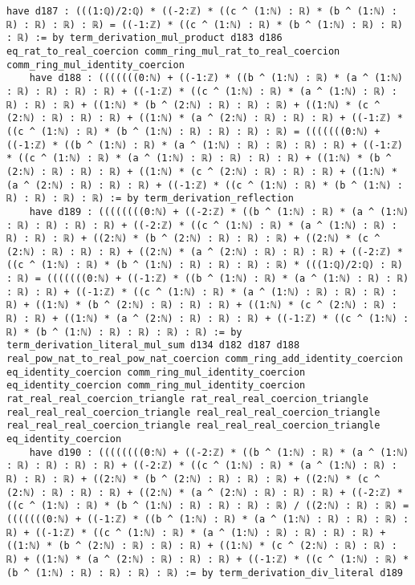 \documentclass{article}
\begin{document}
\begin{tcolorbox}[colback=white!10, width=\linewidth]
\begin{lstlisting}[language=Lean4]
    have d187 : (((1:ℚ)/2:ℚ) * ((-2:ℤ) * ((c ^ (1:ℕ) : ℝ) * (b ^ (1:ℕ) : ℝ) : ℝ) : ℝ) : ℝ) = ((-1:ℤ) * ((c ^ (1:ℕ) : ℝ) * (b ^ (1:ℕ) : ℝ) : ℝ) : ℝ) := by term_derivation_mul_product d183 d186 eq_rat_to_real_coercion comm_ring_mul_rat_to_real_coercion comm_ring_mul_identity_coercion
    have d188 : (((((((0:ℕ) + ((-1:ℤ) * ((b ^ (1:ℕ) : ℝ) * (a ^ (1:ℕ) : ℝ) : ℝ) : ℝ) : ℝ) + ((-1:ℤ) * ((c ^ (1:ℕ) : ℝ) * (a ^ (1:ℕ) : ℝ) : ℝ) : ℝ) : ℝ) + ((1:ℕ) * (b ^ (2:ℕ) : ℝ) : ℝ) : ℝ) + ((1:ℕ) * (c ^ (2:ℕ) : ℝ) : ℝ) : ℝ) + ((1:ℕ) * (a ^ (2:ℕ) : ℝ) : ℝ) : ℝ) + ((-1:ℤ) * ((c ^ (1:ℕ) : ℝ) * (b ^ (1:ℕ) : ℝ) : ℝ) : ℝ) : ℝ) = (((((((0:ℕ) + ((-1:ℤ) * ((b ^ (1:ℕ) : ℝ) * (a ^ (1:ℕ) : ℝ) : ℝ) : ℝ) : ℝ) + ((-1:ℤ) * ((c ^ (1:ℕ) : ℝ) * (a ^ (1:ℕ) : ℝ) : ℝ) : ℝ) : ℝ) + ((1:ℕ) * (b ^ (2:ℕ) : ℝ) : ℝ) : ℝ) + ((1:ℕ) * (c ^ (2:ℕ) : ℝ) : ℝ) : ℝ) + ((1:ℕ) * (a ^ (2:ℕ) : ℝ) : ℝ) : ℝ) + ((-1:ℤ) * ((c ^ (1:ℕ) : ℝ) * (b ^ (1:ℕ) : ℝ) : ℝ) : ℝ) : ℝ) := by term_derivation_reflection
    have d189 : ((((((((0:ℕ) + ((-2:ℤ) * ((b ^ (1:ℕ) : ℝ) * (a ^ (1:ℕ) : ℝ) : ℝ) : ℝ) : ℝ) + ((-2:ℤ) * ((c ^ (1:ℕ) : ℝ) * (a ^ (1:ℕ) : ℝ) : ℝ) : ℝ) : ℝ) + ((2:ℕ) * (b ^ (2:ℕ) : ℝ) : ℝ) : ℝ) + ((2:ℕ) * (c ^ (2:ℕ) : ℝ) : ℝ) : ℝ) + ((2:ℕ) * (a ^ (2:ℕ) : ℝ) : ℝ) : ℝ) + ((-2:ℤ) * ((c ^ (1:ℕ) : ℝ) * (b ^ (1:ℕ) : ℝ) : ℝ) : ℝ) : ℝ) * (((1:ℚ)/2:ℚ) : ℝ) : ℝ) = (((((((0:ℕ) + ((-1:ℤ) * ((b ^ (1:ℕ) : ℝ) * (a ^ (1:ℕ) : ℝ) : ℝ) : ℝ) : ℝ) + ((-1:ℤ) * ((c ^ (1:ℕ) : ℝ) * (a ^ (1:ℕ) : ℝ) : ℝ) : ℝ) : ℝ) + ((1:ℕ) * (b ^ (2:ℕ) : ℝ) : ℝ) : ℝ) + ((1:ℕ) * (c ^ (2:ℕ) : ℝ) : ℝ) : ℝ) + ((1:ℕ) * (a ^ (2:ℕ) : ℝ) : ℝ) : ℝ) + ((-1:ℤ) * ((c ^ (1:ℕ) : ℝ) * (b ^ (1:ℕ) : ℝ) : ℝ) : ℝ) : ℝ) := by term_derivation_literal_mul_sum d134 d182 d187 d188 real_pow_nat_to_real_pow_nat_coercion comm_ring_add_identity_coercion eq_identity_coercion comm_ring_mul_identity_coercion eq_identity_coercion comm_ring_mul_identity_coercion rat_real_real_coercion_triangle rat_real_real_coercion_triangle real_real_real_coercion_triangle real_real_real_coercion_triangle real_real_real_coercion_triangle real_real_real_coercion_triangle eq_identity_coercion
    have d190 : ((((((((0:ℕ) + ((-2:ℤ) * ((b ^ (1:ℕ) : ℝ) * (a ^ (1:ℕ) : ℝ) : ℝ) : ℝ) : ℝ) + ((-2:ℤ) * ((c ^ (1:ℕ) : ℝ) * (a ^ (1:ℕ) : ℝ) : ℝ) : ℝ) : ℝ) + ((2:ℕ) * (b ^ (2:ℕ) : ℝ) : ℝ) : ℝ) + ((2:ℕ) * (c ^ (2:ℕ) : ℝ) : ℝ) : ℝ) + ((2:ℕ) * (a ^ (2:ℕ) : ℝ) : ℝ) : ℝ) + ((-2:ℤ) * ((c ^ (1:ℕ) : ℝ) * (b ^ (1:ℕ) : ℝ) : ℝ) : ℝ) : ℝ) / ((2:ℕ) : ℝ) : ℝ) = (((((((0:ℕ) + ((-1:ℤ) * ((b ^ (1:ℕ) : ℝ) * (a ^ (1:ℕ) : ℝ) : ℝ) : ℝ) : ℝ) + ((-1:ℤ) * ((c ^ (1:ℕ) : ℝ) * (a ^ (1:ℕ) : ℝ) : ℝ) : ℝ) : ℝ) + ((1:ℕ) * (b ^ (2:ℕ) : ℝ) : ℝ) : ℝ) + ((1:ℕ) * (c ^ (2:ℕ) : ℝ) : ℝ) : ℝ) + ((1:ℕ) * (a ^ (2:ℕ) : ℝ) : ℝ) : ℝ) + ((-1:ℤ) * ((c ^ (1:ℕ) : ℝ) * (b ^ (1:ℕ) : ℝ) : ℝ) : ℝ) : ℝ) := by term_derivation_div_literal d189

\end{lstlisting}
\end{tcolorbox}
\end{document}
